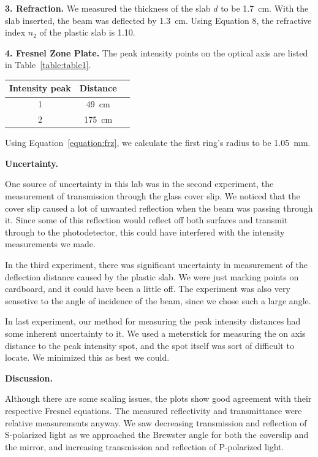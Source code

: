 \documentclass{article}
\newenvironment{2colfig}{
  \par\medskip\noindent\minipage{\linewidth}
} {
  \endminipage\par\medskip
}
\newcommand{\labhead}[1]{
  \vspace{1em}
  {\bf #1}$_{\,}$
  \hline
  \vspace{1em}
}
\begin{document}
\begin{multicols*}{2}
{\bf 3. Refraction.} We measured the thickness of the slab $d$ to be \SI{1.7}{\centi\meter}. With the slab inserted, the
beam was deflected by \SI{1.3}{\centi\meter}. Using Equation 8, the refractive index $n_2$ of the plastic slab is 1.10.

{\bf 4. Fresnel Zone Plate.}  The peak intensity points on the optical axis are listed in Table~\ref{table:table1}. 

\begin{2colfig} 
  \center
  \begin{tabular}{|c|c|c|} \hline
    Intensity peak & Distance\\ \hline
    1 & \SI{49}{\centi\meter} \\ \hline
    2 & \SI{175}{\centi\meter} \\ \hline
  \end{tabular}
  \label{table:table1}
\end{2colfig}

Using Equation~\ref{equation:frz}, we calculate the first ring's radius to be \SI{1.05}{\milli\meter}.

\labhead{Uncertainty.}  
One source of uncertainty in this lab was in the second experiment, the measurement of transmission through the glass
cover slip. We noticed that the cover slip caused a lot of unwanted reflection when the beam was passing through
it. Since some of this reflection would reflect off both surfaces and transmit through to the photodetector, this could
have interfered with the intensity measurements we made.

In the third experiment, there was significant uncertainty in measurement of the deflection distance caused by the
plastic slab. We were just marking points on cardboard, and it could have been a little off. The experiment was also
very sensetive to the angle of incidence of the beam, since we chose such a large angle. 

In last experiment, our method for measuring the peak intensity distances had some inherent uncertainty to it. We used a
meterstick for measuring the on axis distance to the peak intensity spot, and the spot itself was sort of difficult to
locate. We minimized this as best we could.

\labhead{Discussion.}  
Although there are some scaling issues, the plots show good agreement with their respective
Fresnel equations. The measured reflectivity and transmittance were relative measurements anyway. We saw decreasing
transmission and reflection of S-polarized light as we approached the Brewster angle for both the coverslip and the
mirror, and increasing transmission and reflection of P-polarized light.


\end{multicols*}
\end{document}

